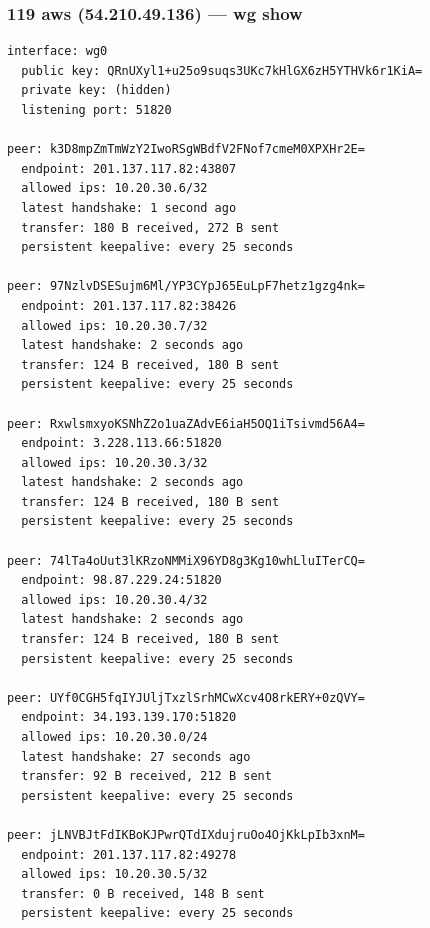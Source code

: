 \documentclass[11pt,a4paper]{article}
\begin{document}
\subsubsection*{119 aws (54.210.49.136) — wg show}
\begin{lstlisting}
interface: wg0
  public key: QRnUXyl1+u25o9suqs3UKc7kHlGX6zH5YTHVk6r1KiA=
  private key: (hidden)
  listening port: 51820

peer: k3D8mpZmTmWzY2IwoRSgWBdfV2FNof7cmeM0XPXHr2E=
  endpoint: 201.137.117.82:43807
  allowed ips: 10.20.30.6/32
  latest handshake: 1 second ago
  transfer: 180 B received, 272 B sent
  persistent keepalive: every 25 seconds

peer: 97NzlvDSESujm6Ml/YP3CYpJ65EuLpF7hetz1gzg4nk=
  endpoint: 201.137.117.82:38426
  allowed ips: 10.20.30.7/32
  latest handshake: 2 seconds ago
  transfer: 124 B received, 180 B sent
  persistent keepalive: every 25 seconds

peer: RxwlsmxyoKSNhZ2o1uaZAdvE6iaH5OQ1iTsivmd56A4=
  endpoint: 3.228.113.66:51820
  allowed ips: 10.20.30.3/32
  latest handshake: 2 seconds ago
  transfer: 124 B received, 180 B sent
  persistent keepalive: every 25 seconds

peer: 74lTa4oUut3lKRzoNMMiX96YD8g3Kg10whLluITerCQ=
  endpoint: 98.87.229.24:51820
  allowed ips: 10.20.30.4/32
  latest handshake: 2 seconds ago
  transfer: 124 B received, 180 B sent
  persistent keepalive: every 25 seconds

peer: UYf0CGH5fqIYJUljTxzlSrhMCwXcv4O8rkERY+0zQVY=
  endpoint: 34.193.139.170:51820
  allowed ips: 10.20.30.0/24
  latest handshake: 27 seconds ago
  transfer: 92 B received, 212 B sent
  persistent keepalive: every 25 seconds

peer: jLNVBJtFdIKBoKJPwrQTdIXdujruOo4OjKkLpIb3xnM=
  endpoint: 201.137.117.82:49278
  allowed ips: 10.20.30.5/32
  transfer: 0 B received, 148 B sent
  persistent keepalive: every 25 seconds

\end{lstlisting}
\end{document}

